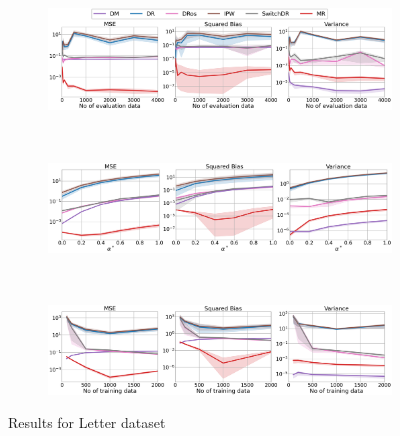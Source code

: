 \begin{figure}[h!]
    \centering
	\begin{subfigure}{0.8\textwidth}
	    \centering
	    \includegraphics[width=1\textwidth]{figures/mr/multiclass/ope_vs_n_alphatar_0_2_letter_ntr1000.png}
	    \label{subfig:letter-neval}
	\end{subfigure}\\
	\begin{subfigure}{0.8\textwidth} 
	    \centering
	    \includegraphics[width=1\textwidth]{figures/mr/multiclass/ope_vs_alphatar_neval_1000_letter_ntr_1000.png}
	    \label{subfig:letter-ae}
	\end{subfigure}\\
        \begin{subfigure}{0.8\textwidth} 
	    \centering
	    \includegraphics[width=1\textwidth]{figures/mr/multiclass/ope_vs_ntr_neval_1000_letter_alpha_0_6.png}
	    \label{subfig:letter-tr}
	\end{subfigure}
    \caption{Results for Letter dataset}
    \label{fig:letter}
\end{figure}

